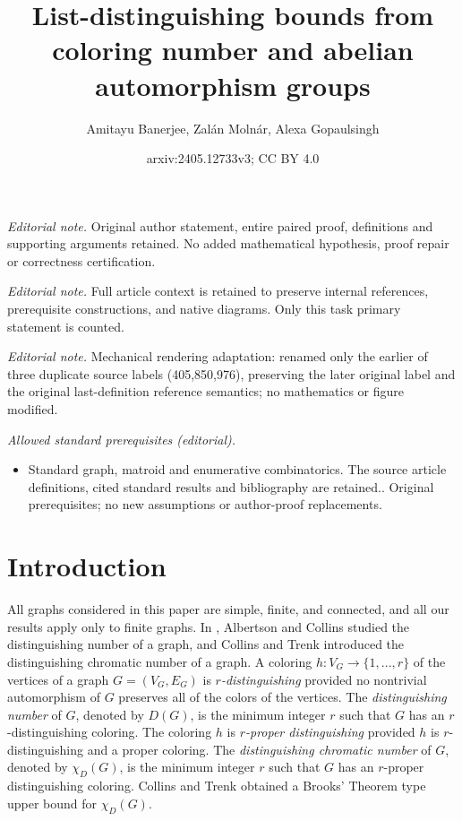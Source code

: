 \documentclass[12pt,reqno,a4paper]{amsart}
\title{List-distinguishing bounds from coloring number and abelian automorphism groups}
\author{Amitayu Banerjee, Zalán Molnár, Alexa Gopaulsingh}
\date{arxiv:2405.12733v3; CC BY 4.0}
\theoremstyle{definition}
\begin{document}
\maketitle
\noindent\textit{Editorial note.} Original author statement, entire paired proof, definitions and supporting arguments retained. No added mathematical hypothesis, proof repair or correctness certification.\par\medskip
\noindent\textit{Editorial note.} Full article context is retained to preserve internal references, prerequisite constructions, and native diagrams. Only this task primary statement is counted.\par\medskip
\noindent\textit{Editorial note.} Mechanical rendering adaptation: renamed only the earlier of three duplicate source labels (405,850,976), preserving the later original label and the original last-definition reference semantics; no mathematics or figure modified.\par\medskip
\noindent\textit{Allowed standard prerequisites (editorial).}\begin{itemize}
\item Standard graph, matroid and enumerative combinatorics. The source article definitions, cited standard results and bibliography are retained.. Original prerequisites; no new assumptions or author-proof replacements.
\end{itemize}\medskip
\section{Introduction}
All graphs considered in this paper are simple, finite, and connected, and all our results apply only to finite graphs. In \cite{AC1996}, Albertson and Collins studied the distinguishing number of a graph, and Collins and Trenk \cite{CT2006} introduced the distinguishing chromatic number of a graph. 
A coloring $h:V_{G}\rightarrow\{1,...,r\}$ of the vertices of a graph $G=(V_{G}, E_{G})$ is {\em $r$-distinguishing} provided no nontrivial automorphism of $G$ preserves all of the colors of the vertices. The {\em distinguishing number} of $G$, denoted by $D(G)$, is the minimum integer $r$ such that $G$ has an $r$-distinguishing coloring. The coloring $h$ is {\em $r$-proper distinguishing} provided $h$ is $r$-distinguishing and a proper coloring. The {\em distinguishing chromatic number} of $G$, denoted by $\chi_{D}(G)$, is the minimum integer $r$ such that $G$ has an $r$-proper distinguishing coloring.
Collins and Trenk \cite{CT2006} obtained a Brooks' Theorem type upper bound for $\chi_{D}(G)$.
\end{document}
